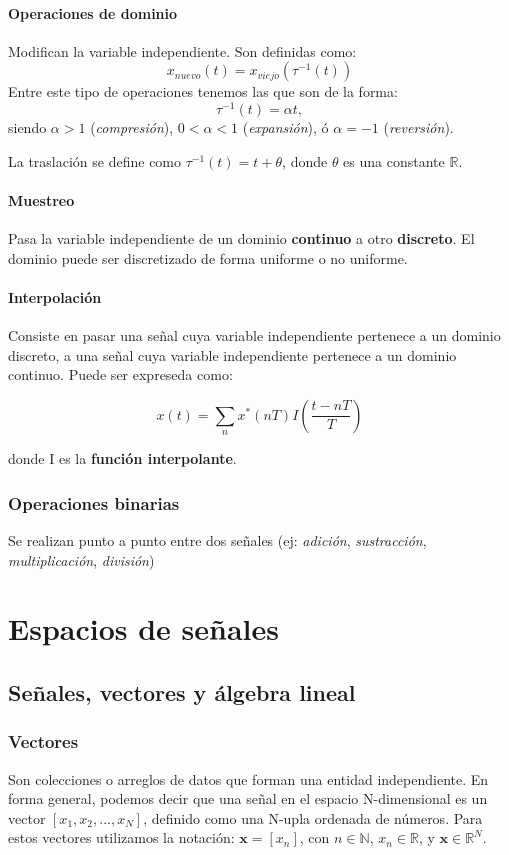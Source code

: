 \documentclass[10pt,a4paper]{book}
\begin{document}
\subsubsection{Operaciones de dominio}
Modifican la variable independiente. Son definidas como:
\[x_{nuevo}(t)=x_{viejo}(\tau ^{-1} (t))\]
Entre este tipo de operaciones tenemos las que son de la forma:
\[\tau ^{-1} (t)= \alpha t,\]
siendo $\alpha > 1$ (\textit{compresión}), $0<\alpha <1$ (\textit{expansión}), ó $\alpha = -1$ (\textit{reversión}).

La traslación se define como $\tau ^{-1} (t) = t + \theta$, donde $\theta$ es una constante $\mathbb{R}$.

\subsubsection{Muestreo}
Pasa la variable independiente de un dominio \textbf{continuo} a otro \textbf{discreto}. El dominio puede ser discretizado de forma uniforme o no uniforme.

\subsubsection{Interpolación}
Consiste en pasar una señal cuya variable independiente pertenece a un dominio discreto, a una señal cuya variable independiente pertenece a un dominio continuo. Puede ser expreseda como:

\[x(t)=\sum_n x^*(nT)I \left(\frac{t-nT}{T}\right) \]

donde I es la \textbf{función interpolante}.

\subsection{Operaciones binarias}
Se realizan punto a punto entre dos señales (ej: \textit{adición}, \textit{sustracción}, \textit{multiplicación}, \textit{división})

\chapter{Espacios de señales}
\section{Señales, vectores y álgebra lineal}
\subsection{Vectores}
Son colecciones o arreglos de datos que forman una entidad independiente. En forma general, podemos decir que una señal en el espacio N-dimensional es un vector $[x_1,x_2,...,x_N]$, definido como una N-upla ordenada de números. Para estos vectores utilizamos la notación: $\mathbf{x}=[x_n]$, con $n \in \mathbb{N}$, $x_n \in \mathbb{R}$, y $\mathbf{x} \in \mathbb{R}^N$. 
\end{document}
